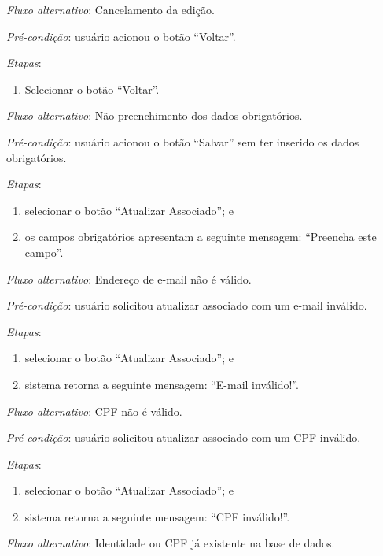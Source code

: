\noindent \textit{Fluxo alternativo}: Cancelamento da edição.

\noindent \textit{Pré-condição}: usuário acionou o botão ``Voltar''.

\noindent \textit{Etapas}:

\begin{enumerate}
    \item Selecionar o botão ``Voltar''.
\end{enumerate}

\noindent \textit{Fluxo alternativo}: Não preenchimento dos dados obrigatórios.

\noindent \textit{Pré-condição}: usuário acionou o botão ``Salvar'' sem ter inserido os dados obrigatórios.

\noindent \textit{Etapas}:

\begin{enumerate}
    \item selecionar o botão ``Atualizar Associado''; e
    \item os campos obrigatórios apresentam a seguinte mensagem: ``Preencha este campo''.
\end{enumerate}


\noindent \textit{Fluxo alternativo}: Endereço de e-mail não é válido.

\noindent \textit{Pré-condição}: usuário solicitou atualizar associado com um e-mail inválido.

\noindent \textit{Etapas}:

\begin{enumerate}
    \item selecionar o botão ``Atualizar Associado''; e
    \item sistema retorna a seguinte mensagem: ``E-mail inválido!''.
\end{enumerate}


\noindent \textit{Fluxo alternativo}: CPF não é válido.

\noindent \textit{Pré-condição}: usuário solicitou atualizar associado com um CPF inválido.

\noindent \textit{Etapas}:

\begin{enumerate}
    \item selecionar o botão ``Atualizar Associado''; e
    \item sistema retorna a seguinte mensagem: ``CPF inválido!''.
\end{enumerate}


\noindent \textit{Fluxo alternativo}: Identidade ou CPF já existente na base de dados.

